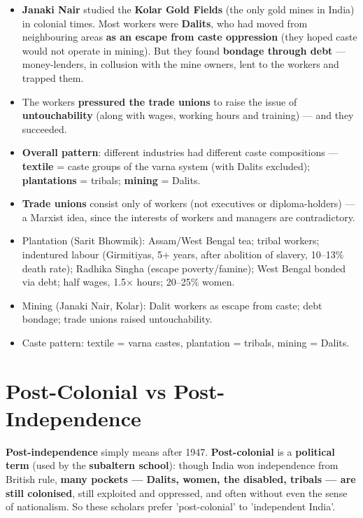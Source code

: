 \begin{KeyConcept}
\begin{itemize}
\item \textbf{Janaki Nair} studied the \textbf{Kolar Gold Fields} (the only gold mines in India) in colonial times. Most workers were \textbf{Dalits}, who had moved from neighbouring areas \textbf{as an escape from caste oppression} (they hoped caste would not operate in mining). But they found \textbf{bondage through debt} --- money-lenders, in collusion with the mine owners, lent to the workers and trapped them.
\item The workers \textbf{pressured the trade unions} to raise the issue of \textbf{untouchability} (along with wages, working hours and training) --- and they succeeded.
\item \textbf{Overall pattern}: different industries had different caste compositions --- \textbf{textile} = caste groups of the varna system (with Dalits excluded); \textbf{plantations} = tribals; \textbf{mining} = Dalits.
\item \textbf{Trade unions} consist only of workers (not executives or diploma-holders) --- a Marxist idea, since the interests of workers and managers are contradictory.
\end{itemize}
\end{KeyConcept}

\begin{QuickRevision}
\begin{itemize}
\item Plantation (Sarit Bhowmik): Assam/West Bengal tea; tribal workers; indentured labour (Girmitiyas, 5+ years, after abolition of slavery, 10--13\% death rate); Radhika Singha (escape poverty/famine); West Bengal bonded via debt; half wages, 1.5× hours; 20--25\% women.
\item Mining (Janaki Nair, Kolar): Dalit workers as escape from caste; debt bondage; trade unions raised untouchability.
\item Caste pattern: textile = varna castes, plantation = tribals, mining = Dalits.
\end{itemize}
\end{QuickRevision}

\section{Post-Colonial vs Post-Independence}

\begin{KeyConcept}
\textbf{Post-independence} simply means after 1947. \textbf{Post-colonial} is a \textbf{political term} (used by the \textbf{subaltern school}): though India won independence from British rule, \textbf{many pockets --- Dalits, women, the disabled, tribals --- are still colonised}, still exploited and oppressed, and often without even the sense of nationalism. So these scholars prefer 'post-colonial' to 'independent India'.
\end{KeyConcept}


